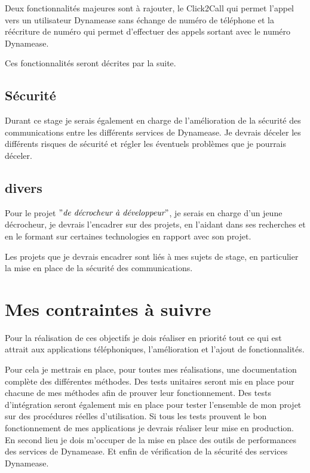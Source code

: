 Deux fonctionnalités majeures sont à rajouter, le Click2Call qui permet l'appel vers un utilisateur Dynamease sans échange de numéro de téléphone et la réécriture de numéro qui permet d'effectuer des appels sortant avec le  numéro Dynamease.

Ces fonctionnalités seront décrites par la suite.

\subsection{Sécurité}

Durant ce stage je serais également en charge de l'amélioration de la sécurité des communications entre les différents services de Dynamease. Je devrais déceler les différents risques de sécurité et régler les éventuels problèmes que je pourrais déceler.

\subsection{divers}

Pour le projet $"\textit{de décrocheur à développeur}"$, je serais en charge d'un jeune décrocheur, je devrais l'encadrer sur des projets, en l'aidant dans ses recherches et en le formant sur certaines technologies en rapport avec son projet.

Les projets que je devrais encadrer sont liés à mes sujets de stage, en particulier la mise en place de la sécurité des communications.

\section{Mes contraintes à suivre}

Pour la réalisation de ces objectifs je dois réaliser en priorité tout ce qui est attrait aux applications téléphoniques, l'amélioration et l'ajout de fonctionnalités.

Pour cela je mettrais en place, pour toutes mes réalisations, une documentation complète des différentes méthodes. Des tests unitaires seront mis en place pour chacune de mes méthodes afin de prouver leur fonctionnement. Des tests d'intégration seront également mis en place pour tester l'ensemble de mon projet sur des procédures réelles d'utilisation. Si tous les tests prouvent le bon fonctionnement de mes applications je devrais réaliser leur mise en production.\\

En second lieu je dois m'occuper de la mise en place des outils de performances des services de Dynamease. Et enfin de vérification de la sécurité des services Dynamease.